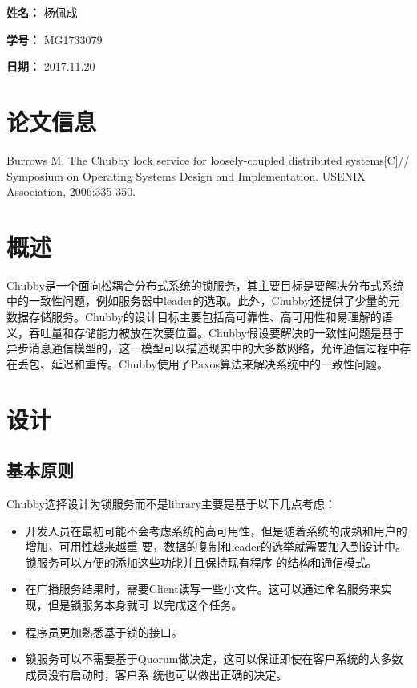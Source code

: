 \documentclass[UTF8]{article}
\begin{document}
    
{\flushleft \bf \Large 姓名：} 杨佩成

{\flushleft \bf \Large 学号：} MG1733079

{\flushleft \bf \Large 日期：} 2017.11.20


\section*{论文信息}
    
Burrows M. The Chubby lock service for loosely-coupled distributed systems[C]// Symposium on Operating Systems Design and Implementation. USENIX Association, 2006:335-350.


    
\section{概述}
	Chubby是一个面向松耦合分布式系统的锁服务，其主要目标是要解决分布式系统中的一致性问题，例如服务器中leader的选取。此外，Chubby还提供了少量的元数据存储服务。Chubby的设计目标主要包括高可靠性、高可用性和易理解的语义，吞吐量和存储能力被放在次要位置。Chubby假设要解决的一致性问题是基于异步消息通信模型的，这一模型可以描述现实中的大多数网络，允许通信过程中存在丢包、延迟和重传。Chubby使用了Paxos算法来解决系统中的一致性问题。    
\section{设计}
	\subsection{基本原则}
	Chubby选择设计为锁服务而不是library主要是基于以下几点考虑：
\begin{itemize}
	\item
		开发人员在最初可能不会考虑系统的高可用性，但是随着系统的成熟和用户的增加，可用性越来越重		要，数据的复制和leader的选举就需要加入到设计中。锁服务可以方便的添加这些功能并且保持现有程序		的结构和通信模式。
	\item
		在广播服务结果时，需要Client读写一些小文件。这可以通过命名服务来实现，但是锁服务本身就可		以完成这个任务。
	\item
		程序员更加熟悉基于锁的接口。
	\item
		锁服务可以不需要基于Quorum做决定，这可以保证即使在客户系统的大多数成员没有启动时，客户系		统也可以做出正确的决定。
\end{itemize}
\end{document}

